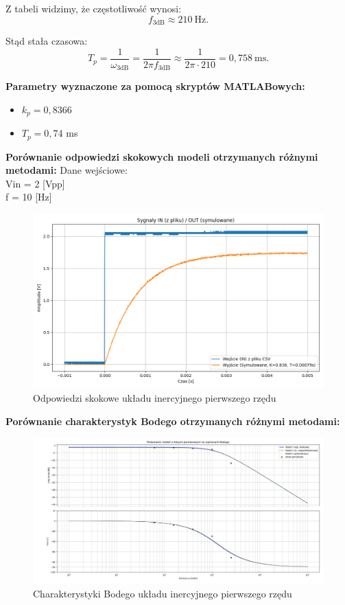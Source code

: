 \documentclass[12pt,a4paper]{article}
\begin{document}
	Z tabeli widzimy, że częstotliwość wynosi:
	\[
	f_{3\text{dB}} \approx 210\ \text{Hz}.
	\]
	
	Stąd stała czasowa:
	\begin{equation}
		T_p = \frac{1}{\omega_{3\text{dB}}} = \frac{1}{2\pi f_{3\text{dB}}}
		\approx \frac{1}{2\pi\cdot 210} = 0{,}758\ \text{ms}.
	\end{equation}
	
	\noindent \textbf{Parametry wyznaczone za pomocą skryptów MATLABowych:}
	\begin{itemize}
		\item $k_p = 0{,}8366$ 
		\item $T_p = 0{,}74$ ms
	\end{itemize}
	
	\noindent \textbf{Porównanie odpowiedzi skokowych modeli otrzymanych różnymi metodami:}
	Dane wejściowe: \\
	Vin = 2 [Vpp]\\
	f = 10 [Hz]
		
	\begin{figure}[H]
		\centering
		\includegraphics[width=1\linewidth]{zdjecia/OdpSkokowa1.png}
		\caption{Odpowiedzi skokowe układu inercyjnego pierwszego rzędu}
		\label{fig:OdpSkokowa1}
	\end{figure}
	
	\noindent \textbf{Porównanie charakterystyk Bodego otrzymanych różnymi metodami:}
	\begin{figure}[H]
		\centering
		\includegraphics[width=1\linewidth]{zdjecia/Body1.png}
		\caption{Charakterystyki Bodego układu inercyjnego pierwszego rzędu}
		\label{fig:Body1}
	\end{figure}
	
\end{document}

